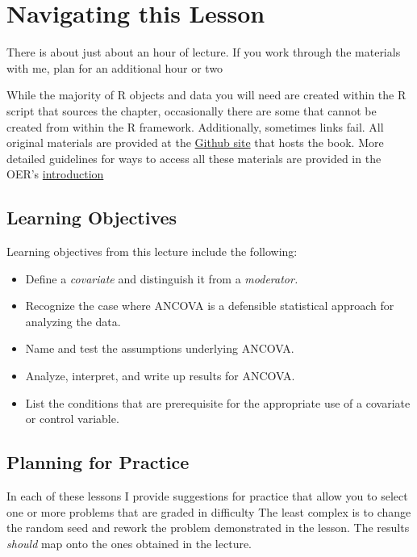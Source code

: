 \documentclass[
  11pt,
]{book}
\providecommand{\tightlist}{%
  \setlength{\itemsep}{0pt}\setlength{\parskip}{0pt}}
\begin{document}
\hypertarget{navigating-this-lesson-9}{%
\section{Navigating this Lesson}\label{navigating-this-lesson-9}}

There is about just about an hour of lecture. If you work through the materials with me, plan for an additional hour or two

While the majority of R objects and data you will need are created within the R script that sources the chapter, occasionally there are some that cannot be created from within the R framework. Additionally, sometimes links fail. All original materials are provided at the \href{https://github.com/lhbikos/ReCenterPsychStats}{Github site} that hosts the book. More detailed guidelines for ways to access all these materials are provided in the OER's \protect\hyperlink{ReCintro}{introduction}

\hypertarget{learning-objectives-9}{%
\subsection{Learning Objectives}\label{learning-objectives-9}}

Learning objectives from this lecture include the following:

\begin{itemize}
\tightlist
\item
  Define a \emph{covariate} and distinguish it from a \emph{moderator.}
\item
  Recognize the case where ANCOVA is a defensible statistical approach for analyzing the data.
\item
  Name and test the assumptions underlying ANCOVA.
\item
  Analyze, interpret, and write up results for ANCOVA.
\item
  List the conditions that are prerequisite for the appropriate use of a covariate or control variable.
\end{itemize}

\hypertarget{planning-for-practice-8}{%
\subsection{Planning for Practice}\label{planning-for-practice-8}}

In each of these lessons I provide suggestions for practice that allow you to select one or more problems that are graded in difficulty The least complex is to change the random seed and rework the problem demonstrated in the lesson. The results \emph{should} map onto the ones obtained in the lecture.
\end{document}

